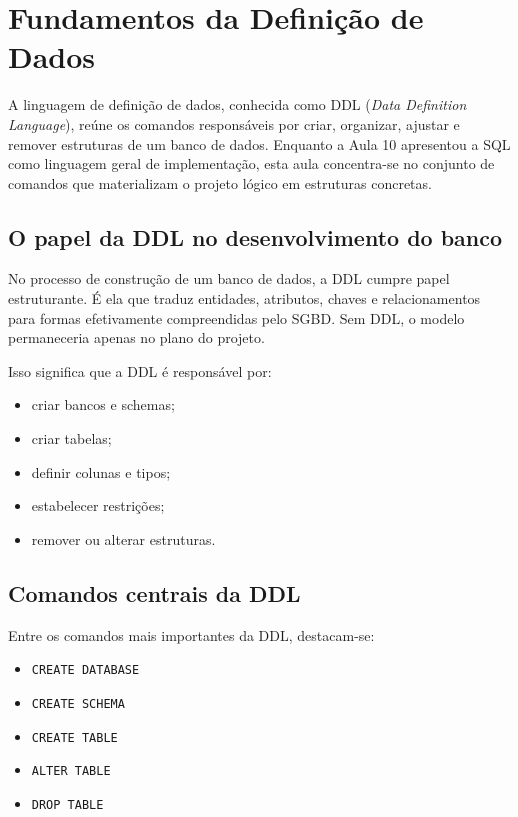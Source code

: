 \chapter{Fundamentos da Definição de Dados}
\label{cap:fundamentos_definicao_dados}

A linguagem de definição de dados, conhecida como DDL (\textit{Data Definition Language}), reúne os comandos responsáveis por criar, organizar, ajustar e remover estruturas de um banco de dados. Enquanto a Aula 10 apresentou a SQL como linguagem geral de implementação, esta aula concentra-se no conjunto de comandos que materializam o projeto lógico em estruturas concretas.

\section{O papel da DDL no desenvolvimento do banco}

No processo de construção de um banco de dados, a DDL cumpre papel estruturante. É ela que traduz entidades, atributos, chaves e relacionamentos para formas efetivamente compreendidas pelo SGBD. Sem DDL, o modelo permaneceria apenas no plano do projeto.

Isso significa que a DDL é responsável por:

\begin{itemize}
    \item criar bancos e schemas;
    \item criar tabelas;
    \item definir colunas e tipos;
    \item estabelecer restrições;
    \item remover ou alterar estruturas.
\end{itemize}

\section{Comandos centrais da DDL}

Entre os comandos mais importantes da DDL, destacam-se:

\begin{itemize}
    \item \texttt{CREATE DATABASE}
    \item \texttt{CREATE SCHEMA}
    \item \texttt{CREATE TABLE}
    \item \texttt{ALTER TABLE}
    \item \texttt{DROP TABLE}
\end{itemize}

